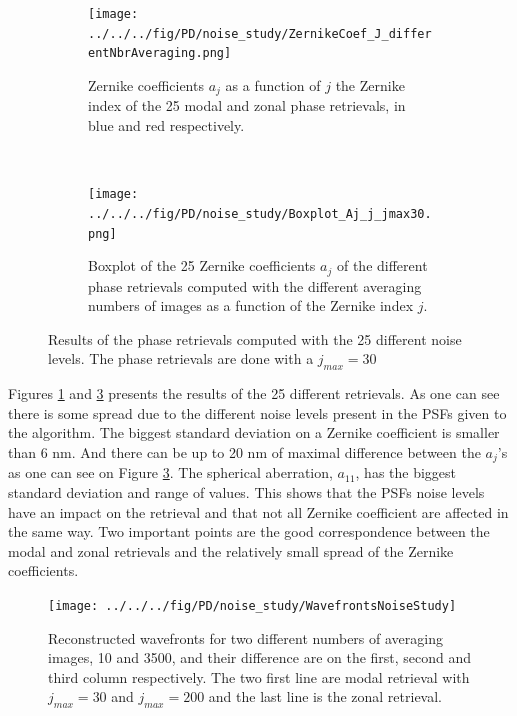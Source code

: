 \begin{figure}
\centering
    \begin{subfigure}{\textwidth}
        \texttt{[image: ../../../fig/PD/noise\_study/ZernikeCoef\_J\_differentNbrAveraging.png]}
        \caption{Zernike coefficients $a_j$ as a function of $j$ the Zernike index of the 25 modal and zonal phase retrievals, in blue and red respectively.}
        \label{subfig:ZernikeCoef_J_differentNbrAveragingjmax30}
    \end{subfigure}
    \\
    \begin{subfigure}{0.75\textwidth}
        \texttt{[image: ../../../fig/PD/noise\_study/Boxplot\_Aj\_j\_jmax30.png]}
        \caption{Boxplot of the 25 Zernike coefficients $a_j$ of the different phase retrievals computed with the different averaging numbers of images as a function of the Zernike index $j$.}
        \label{subfig:Boxplot_Aj_j_jmax30}
    \end{subfigure}
    \decoRule
    \caption{Results of the phase retrievals computed with the 25 different noise levels. The phase retrievals are done with a $j_{max} = 30$}
\end{figure}

Figures \ref{subfig:ZernikeCoef_J_differentNbrAveragingjmax30} and \ref{subfig:Boxplot_Aj_j_jmax30} presents the results of the 25 different retrievals. As one can see there is some spread due to the different noise levels present in the PSFs given to the algorithm. The biggest standard deviation on a Zernike coefficient is smaller than 6 nm. And there can be up to 20 nm of maximal difference between the $a_j$'s as one can see on Figure \ref{subfig:Boxplot_Aj_j_jmax30}. The spherical aberration, $a_{11}$, has the biggest standard deviation and range of values. This shows that the PSFs noise levels have an impact on the retrieval and that not all Zernike coefficient are affected in the same way. Two important points are the good correspondence between the modal and zonal retrievals and the relatively small spread of the Zernike coefficients.

\begin{figure}
\begin{center}
\texttt{[image: ../../../fig/PD/noise\_study/WavefrontsNoiseStudy]}
\decoRule
\caption{Reconstructed wavefronts for two different numbers of averaging images, 10 and 3500, and their difference are on the first, second and third column respectively. The two first line are modal retrieval with $j_{max}=30$ and $j_{max}=200$ and the last line is the zonal retrieval.}
\label{fig:WavefrontsNoiseStudy}
\end{center}
\end{figure}

